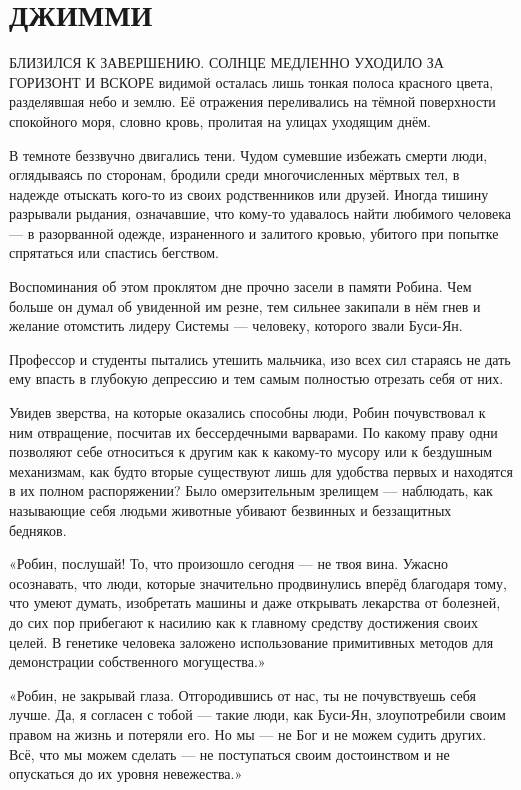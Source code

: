 \documentclass[a4paper,12pt]{book}
\begin{document}
\chapter{ДЖИММИ}
\noindent{} БЛИЗИЛСЯ К ЗАВЕРШЕНИЮ. СОЛНЦЕ МЕДЛЕННО УХОДИЛО ЗА ГОРИЗОНТ И ВСКОРЕ видимой осталась лишь тонкая полоса красного цвета, разделявшая небо и землю. Её отражения переливались на тёмной поверхности спокойного моря, словно кровь, пролитая на улицах уходящим днём.
\par
В темноте беззвучно двигались тени. Чудом сумевшие избежать смерти люди, оглядываясь по сторонам, бродили среди многочисленных мёртвых тел, в надежде отыскать кого-то из своих родственников или друзей. Иногда тишину разрывали рыдания, означавшие, что кому-то удавалось найти любимого человека — в разорванной одежде, израненного и залитого кровью, убитого при попытке спрятаться или спастись бегством.
\par
Воспоминания об этом проклятом дне прочно засели в памяти Робина. Чем больше он думал об увиденной им резне, тем сильнее закипали в нём гнев и желание отомстить лидеру Системы — человеку, которого звали Буси-Ян.
\par
Профессор и студенты пытались утешить мальчика, изо всех сил стараясь не дать ему впасть в глубокую депрессию и тем самым полностью отрезать себя от них.
\par
Увидев зверства, на которые оказались способны люди, Робин почувствовал к ним отвращение, посчитав их бессердечными варварами. По какому праву одни позволяют себе относиться к другим как к какому-то мусору или к бездушным механизмам, как будто вторые существуют лишь для удобства первых и находятся в их полном распоряжении? Было омерзительным зрелищем — наблюдать, как называющие себя людьми животные убивают 
безвинных и беззащитных бедняков.\\
\par
«Робин, послушай! То, что произошло сегодня — не твоя вина. Ужасно осознавать, что люди, которые значительно продвинулись вперёд благодаря тому, что умеют думать, изобретать машины и даже открывать лекарства от болезней, до сих пор прибегают к насилию как к главному средству достижения своих целей. В генетике человека заложено использование примитивных методов для демонстрации собственного могущества.»
\par
«Робин, не закрывай глаза. Отгородившись от нас, ты не почувствуешь себя лучше. Да, я согласен с тобой — такие люди, как Буси-Ян, злоупотребили своим правом на жизнь и потеряли его. Но мы — не Бог и не можем судить других. Всё, что мы можем сделать — не поступаться своим достоинством и не опускаться до их уровня невежества.»
\end{document}
